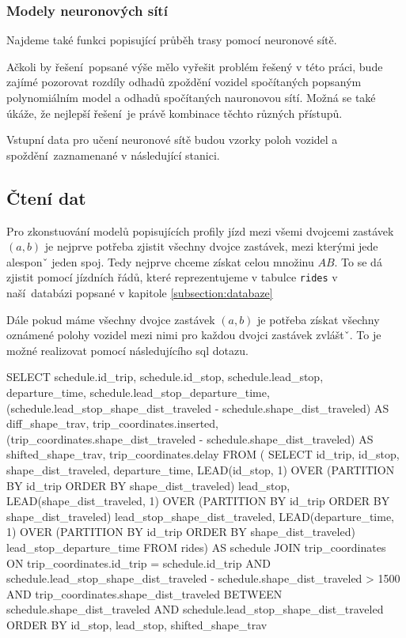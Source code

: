 \subsubsection{Modely neuronových sítí}

Najdeme také funkci popisující průběh trasy pomocí neuronové sítě.

\bigbreak

Ačkoli by řešení popsané výše mělo vyřešit problém řešený v této práci, bude zajímé pozorovat rozdíly odhadů zpoždění vozidel spočítaných popsaným polynomiálním model a odhadů spočítaných nauronovou sítí. Možná se také úkáže, že nejlepší řešení je právě kombinace těchto různých přístupů.

\bigbreak

Vstupní data pro učení neuronové sítě budou vzorky poloh vozidel a spoždění zaznamenané v následující stanici.

\subsection{Čtení dat}

Pro zkonstuování modelů popisujících profily jízd mezi všemi dvojcemi zastávek $(a, b)$ je nejprve potřeba zjistit všechny dvojce zastávek, mezi kterými jede alesponˇ jeden spoj. Tedy nejprve chceme získat celou množinu $AB$. To se dá zjistit pomocí jízdních řádů, které reprezentujeme v tabulce \verb-rides- v naší databázi popsané v kapitole \ref{subsection:databaze}

\bigbreak

 Dále pokud máme všechny dvojce zastávek $(a, b)$ je potřeba získat všechny oznámené polohy vozidel mezi nimi pro každou dvojci zastávek zvláštˇ. To je možné realizovat pomocí následujícího \gls{sql} dotazu.

\begin{code}[frame=none]
SELECT schedule.id_trip,
  schedule.id_stop,
  schedule.lead_stop,
  departure_time,
  schedule.lead_stop_departure_time,
  (schedule.lead_stop_shape_dist_traveled - schedule.shape_dist_traveled)
    AS diff_shape_trav,
  trip_coordinates.inserted,
  (trip_coordinates.shape_dist_traveled - schedule.shape_dist_traveled)
    AS shifted_shape_trav,
  trip_coordinates.delay
FROM (
  SELECT id_trip, id_stop, shape_dist_traveled, departure_time,
    LEAD(id_stop, 1) OVER (PARTITION BY
	  id_trip ORDER BY shape_dist_traveled) lead_stop,
    LEAD(shape_dist_traveled, 1) OVER (PARTITION BY
	  id_trip ORDER BY shape_dist_traveled) lead_stop_shape_dist_traveled,
    LEAD(departure_time, 1) OVER (PARTITION BY
	  id_trip ORDER BY shape_dist_traveled) lead_stop_departure_time
  FROM rides) AS schedule
JOIN trip_coordinates
ON trip_coordinates.id_trip = schedule.id_trip AND
  schedule.lead_stop_shape_dist_traveled -
    schedule.shape_dist_traveled > 1500 AND
  trip_coordinates.shape_dist_traveled
    BETWEEN schedule.shape_dist_traveled AND
  schedule.lead_stop_shape_dist_traveled
ORDER BY id_stop, lead_stop, shifted_shape_trav
\end{code}

